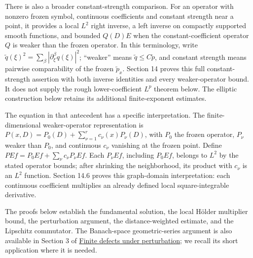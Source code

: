 \documentclass[
  11pt,
]{article}
\makeatletter
\let\ReaderOriginalAnchorStart\hyper@anchorstart
\let\ReaderOriginalAnchorEnd\hyper@anchorend
\let\ReaderPendingAliases\@empty
\def\ReaderArmAliases#1{\gdef\ReaderPendingAliases{#1}}
\def\hyper@anchorstart#1{\ReaderIfNativeAnchorTF{#1}{\ReaderPendingAliases\global\let\ReaderPendingAliases\@empty}{}\ReaderOriginalAnchorStart{#1}}
\makeatother
\begin{document}
There is also a broader constant-strength comparison. For an operator
with nonzero frozen symbol, continuous coefficients and constant
strength near a point, it provides a local \(L^2\) right inverse, a left
inverse on compactly supported smooth functions, and bounded \(Q(D)E\)
when the constant-coefficient operator \(Q\) is weaker than the frozen
operator. In this terminology, write
\(\widetilde q(\xi)^2=\sum_\beta|\partial_\xi^\beta q(\xi)|^2\);
``weaker'' means \(\widetilde q\leq C\widetilde p\), and constant
strength means pairwise comparability of the frozen \(\widetilde p_x\).
Section 14 proves this full constant-strength assertion with both
inverse identities and every weaker-operator bound. It does not supply
the rough lower-coefficient \(L^p\) theorem below. The elliptic
construction below retains its additional finite-exponent estimates.

The equation in that antecedent has a specific interpretation. The
finite-dimensional weaker-operator representation is
\(P(x,D)=P_0(D)+\sum_{\nu=1}^r c_\nu(x)P_\nu(D)\), with \(P_0\) the
frozen operator, \(P_\nu\) weaker than \(P_0\), and continuous \(c_\nu\)
vanishing at the frozen point. Define
\(PEf=P_0Ef+\sum_\nu c_\nu P_\nu Ef\). Each \(P_\nu Ef\), including
\(P_0Ef\), belongs to \(L^2\) by the stated operator bounds; after
shrinking the neighborhood, its product with \(c_\nu\) is an \(L^2\)
function. Section 14.6 proves this graph-domain interpretation: each
continuous coefficient multiplies an already defined local
square-integrable derivative.

The proofs below establish the fundamental solution, the local Hölder
multiplier bound, the perturbation argument, the distance-weighted
estimate, and the Lipschitz commutator. The Banach-space
geometric-series argument is also available in Section 3 of
\href{fredholm-stability.pdf}{Finite defects under perturbation}; we
recall its short application where it is needed.

\ReaderArmAliases{\ReaderOriginalAnchorStart{AN03-LCE-002}\ReaderOriginalAnchorEnd\begingroup\expandafter\def\csname @currentHref\endcsname{AN03-LCE-002}\label{AN03-LCE-002}\endgroup\ReaderOriginalAnchorStart{an03-lce-002-a-frozen-solver-without-a-restriction-on-dimension-or-order}\ReaderOriginalAnchorEnd\begingroup\expandafter\def\csname @currentHref\endcsname{an03-lce-002-a-frozen-solver-without-a-restriction-on-dimension-or-order}\label{an03-lce-002-a-frozen-solver-without-a-restriction-on-dimension-or-order}\endgroup\ReaderOriginalAnchorStart{2-a-frozen-solver-without-a-restriction-on-dimension-or-order}\ReaderOriginalAnchorEnd\begingroup\expandafter\def\csname @currentHref\endcsname{2-a-frozen-solver-without-a-restriction-on-dimension-or-order}\label{2-a-frozen-solver-without-a-restriction-on-dimension-or-order}\endgroup\ReaderOriginalAnchorStart{a-frozen-solver-without-a-restriction-on-dimension-or-order}\ReaderOriginalAnchorEnd}
\end{document}
